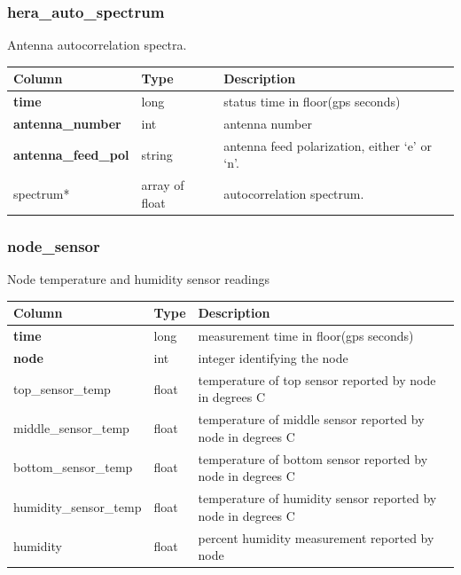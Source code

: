 \documentclass{article}
\begin{document}
{\subsubsection{hera\_auto\_spectrum}
Antenna autocorrelation spectra.
\begin{center}
\begin{tabular}{| p{4cm} | p{2cm} | p{10cm} |}
\hline
 {\bf Column} & {\bf Type}  & {\bf Description} \\ [0.5ex]  \hline\hline
\textbf{time} & long & status time in floor(gps seconds)\\ \hline
\textbf{antenna\_number} & int & antenna number \\ \hline
\textbf{antenna\_feed\_pol} & string & antenna feed polarization, either `e' or `n'. \\ \hline
spectrum* & array of float & autocorrelation spectrum. \\ \hline
\end{tabular}
\end{center}

\subsubsection{node\_sensor}
Node temperature and humidity sensor readings
\begin{center}
 \begin{tabular}{| p{4cm} | p{2cm} | p{10cm} |}
\hline
 {\bf Column} & {\bf Type}  & {\bf Description} \\ [0.5ex]  \hline\hline
\textbf{time} & long & measurement time in floor(gps seconds)\\ \hline
\textbf{node} & int & integer identifying the node \\ \hline
top\_sensor\_temp & float & temperature of top sensor reported by node in degrees C \\\hline
middle\_sensor\_temp & float & temperature of middle sensor reported by node in degrees C \\\hline
bottom\_sensor\_temp & float & temperature of bottom sensor reported by node in degrees C \\\hline
humidity\_sensor\_temp & float & temperature of humidity sensor reported by node in degrees C \\\hline
humidity & float & percent humidity measurement reported by node\\\hline
\end{tabular}
\end{center}

}
\end{document}
